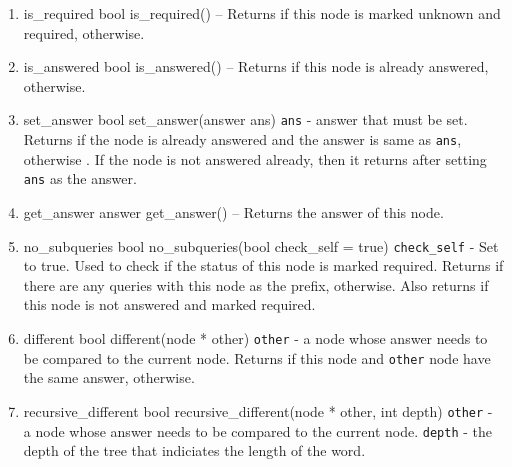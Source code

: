\begin{enumerate}
\begin{detail}
{mark\_required}
{bool mark\_required()}
{--}
{Returns \true if answer to this node is required. Returns \false if the answer is already known.} 
\end{detail}
\item \begin{detail}
{is\_required}
{bool is\_required()}
{--}
{Returns \true if this node is marked unknown and required, \false otherwise.} 
\end{detail}
\item \begin{detail}
{is\_answered}
{bool is\_answered()}
{--}
{Returns \true if this node is already answered, \false otherwise.} 
\end{detail}
\item \begin{detail}
{set\_answer}
{bool set\_answer(answer ans)}
{\texttt{ans} - answer that must be set.}
{Returns \true if the node is already answered and the answer is same as \texttt{ans}, otherwise \false. If the node is not answered already, then it returns \true after setting \texttt{ans} as the answer.} 
\end{detail}
\item \begin{detail}
{get\_answer}
{answer get\_answer()}
{--}
{Returns the answer of this node.} 
\end{detail}
\item \begin{detail}
{no\_subqueries}
{bool no\_subqueries(bool check\_self = true)}
{\texttt{check\_self} - Set to true. Used to check if the status of this node is marked required. }
{Returns \true if there are any queries with this node as the prefix, \false otherwise. Also returns \false if this node is not answered and marked required.} 
\end{detail}
\item \begin{detail}
{different}
{bool different(node * other)}
{\texttt{other} - a node whose answer needs to be compared to the current node. }
{Returns \true if this node and \texttt{other} node have the same answer, \false otherwise. } 
\end{detail}
\item \begin{detail}
{recursive\_different}
{bool recursive\_different(node * other, int depth)}
{\texttt{other} - a node whose answer needs to be compared to the current node.
 \texttt{depth} - the depth of the tree that indiciates the length of the word. }

\end{detail}
\end{enumerate}
